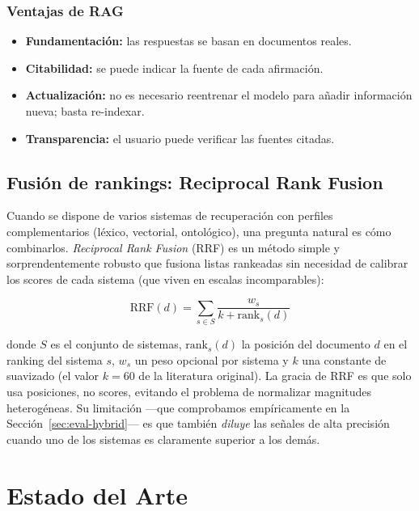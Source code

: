 \documentclass[12pt, a4paper, twoside]{report}
\begin{document}
\subsection{Ventajas de RAG}

\begin{itemize}
  \item \textbf{Fundamentaci\'on:} las respuestas se basan en documentos reales.
  \item \textbf{Citabilidad:} se puede indicar la fuente de cada afirmaci\'on.
  \item \textbf{Actualizaci\'on:} no es necesario reentrenar el modelo para a\~nadir informaci\'on nueva; basta re-indexar.
  \item \textbf{Transparencia:} el usuario puede verificar las fuentes citadas.
\end{itemize}

\section{Fusi\'on de rankings: Reciprocal Rank Fusion}
\label{sec:rrf}

Cuando se dispone de varios sistemas de recuperaci\'on con perfiles complementarios (l\'exico, vectorial, ontol\'ogico), una pregunta natural es c\'omo combinarlos. \textit{Reciprocal Rank Fusion} (RRF) \cite{cormack2009} es un m\'etodo simple y sorprendentemente robusto que fusiona listas rankeadas sin necesidad de calibrar los scores de cada sistema (que viven en escalas incomparables):

\begin{equation}
  \text{RRF}(d) = \sum_{s \in S} \frac{w_s}{k + \text{rank}_s(d)}
\end{equation}

donde $S$ es el conjunto de sistemas, $\text{rank}_s(d)$ la posici\'on del documento $d$ en el ranking del sistema $s$, $w_s$ un peso opcional por sistema y $k$ una constante de suavizado (el valor $k=60$ de la literatura original). La gracia de RRF es que solo usa posiciones, no scores, evitando el problema de normalizar magnitudes heterog\'eneas. Su limitaci\'on ---que comprobamos emp\'iricamente en la Secci\'on~\ref{sec:eval-hybrid}--- es que tambi\'en \textit{diluye} las se\~nales de alta precisi\'on cuando uno de los sistemas es claramente superior a los dem\'as.


\chapter{Estado del Arte}
\label{ch:estado-arte}
\end{document}
